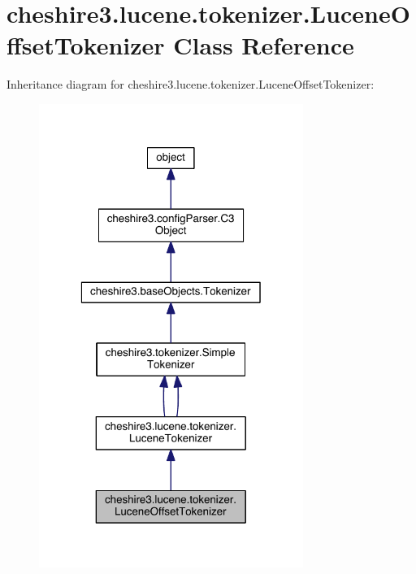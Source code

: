\hypertarget{classcheshire3_1_1lucene_1_1tokenizer_1_1_lucene_offset_tokenizer}{\section{cheshire3.\-lucene.\-tokenizer.\-Lucene\-Offset\-Tokenizer Class Reference}
\label{classcheshire3_1_1lucene_1_1tokenizer_1_1_lucene_offset_tokenizer}
}


Inheritance diagram for cheshire3.\-lucene.\-tokenizer.\-Lucene\-Offset\-Tokenizer\-:
\nopagebreak
\begin{figure}[H]
\begin{center}
\leavevmode
\includegraphics[width=244pt]{classcheshire3_1_1lucene_1_1tokenizer_1_1_lucene_offset_tokenizer__inherit__graph}
\end{center}
\end{figure}


